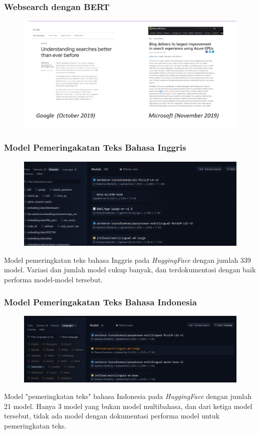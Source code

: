 \documentclass[10pt]{beamer}
\newcommand{\f}[1]{\textit{#1}}
\begin{document}
\begin{frame}
    \frametitle{Websearch dengan BERT}
    \begin{figure}
        \centering
        \includegraphics[width=1\textwidth]{assets/pics/google-bert.png}
    \end{figure}
\end{frame}

\begin{frame}
    \frametitle{Model Pemeringakatan Teks Bahasa Inggris}
    \begin{figure}
        \centering
        \includegraphics[width=1\textwidth]{assets/pics/EnglishNLP.png}
    \end{figure}
    Model pemeringkatan teks bahasa Inggris pada \f{HuggingFace} dengan jumlah 339 model. Variasi dan jumlah model cukup banyak, dan terdokumentasi dengan baik performa model-model tersebut.
\end{frame}

\begin{frame}
    \frametitle{Model Pemeringakatan Teks Bahasa Indonesia}
    \begin{figure}
        \centering
        \includegraphics[width=1\textwidth]{assets/pics/IndoNLP.png}
    \end{figure}    
    Model "pemeringkatan teks" bahasa Indonesia pada \f{HuggingFace} dengan jumlah 21 model. Hanya 3 model yang bukan model multibahasa, dan dari ketiga model tersebut, tidak ada model dengan dokumentasi performa model untuk pemeringkatan teks.
\end{frame}
\end{document}

